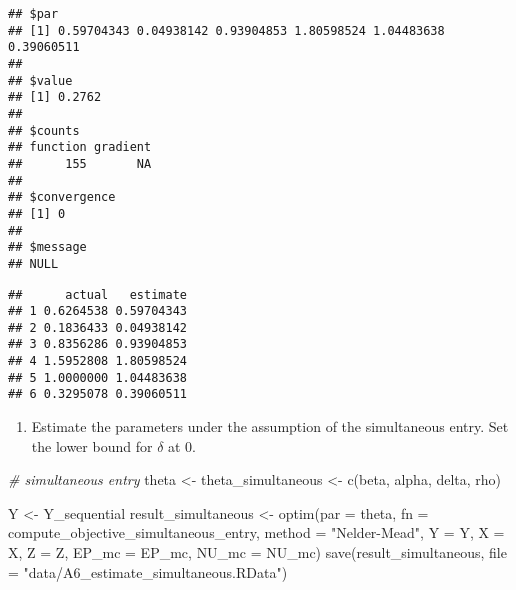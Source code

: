 \documentclass[
]{article}
\newenvironment{Shaded}{\begin{snugshade}}{\end{snugshade}}
\newcommand{\AttributeTok}[1]{\textcolor[rgb]{0.77,0.63,0.00}{#1}}
\newcommand{\CommentTok}[1]{\textcolor[rgb]{0.56,0.35,0.01}{\textit{#1}}}
\newcommand{\FunctionTok}[1]{\textcolor[rgb]{0.00,0.00,0.00}{#1}}
\newcommand{\NormalTok}[1]{#1}
\newcommand{\OtherTok}[1]{\textcolor[rgb]{0.56,0.35,0.01}{#1}}
\newcommand{\SpecialCharTok}[1]{\textcolor[rgb]{0.00,0.00,0.00}{#1}}
\newcommand{\StringTok}[1]{\textcolor[rgb]{0.31,0.60,0.02}{#1}}
\providecommand{\tightlist}{%
  \setlength{\itemsep}{0pt}\setlength{\parskip}{0pt}}
\begin{document}
\begin{verbatim}
## $par
## [1] 0.59704343 0.04938142 0.93904853 1.80598524 1.04483638 0.39060511
## 
## $value
## [1] 0.2762
## 
## $counts
## function gradient 
##      155       NA 
## 
## $convergence
## [1] 0
## 
## $message
## NULL
\end{verbatim}

\begin{Shaded}
\end{Shaded}

\begin{verbatim}
##      actual   estimate
## 1 0.6264538 0.59704343
## 2 0.1836433 0.04938142
## 3 0.8356286 0.93904853
## 4 1.5952808 1.80598524
## 5 1.0000000 1.04483638
## 6 0.3295078 0.39060511
\end{verbatim}

\begin{enumerate}
\def\labelenumi{\arabic{enumi}.}
\setcounter{enumi}{6}
\tightlist
\item
  Estimate the parameters under the assumption of the simultaneous
  entry. Set the lower bound for \(\delta\) at 0.
\end{enumerate}

\begin{Shaded}
\begin{Highlighting}[]
\CommentTok{\# simultaneous entry}
\NormalTok{theta }\OtherTok{\textless{}{-}}\NormalTok{ theta\_simultaneous }\OtherTok{\textless{}{-}}
  \FunctionTok{c}\NormalTok{(beta, alpha, delta, rho)}
\end{Highlighting}
\end{Shaded}

\begin{Shaded}
\begin{Highlighting}[]
\NormalTok{Y }\OtherTok{\textless{}{-}}\NormalTok{ Y\_sequential}
\NormalTok{result\_simultaneous }\OtherTok{\textless{}{-}}
  \FunctionTok{optim}\NormalTok{(}\AttributeTok{par =}\NormalTok{ theta,}
        \AttributeTok{fn =}\NormalTok{ compute\_objective\_simultaneous\_entry,}
        \AttributeTok{method =} \StringTok{"Nelder{-}Mead"}\NormalTok{,}
        \AttributeTok{Y =}\NormalTok{ Y,}
        \AttributeTok{X =}\NormalTok{ X,}
        \AttributeTok{Z =}\NormalTok{ Z,}
        \AttributeTok{EP\_mc =}\NormalTok{ EP\_mc,}
        \AttributeTok{NU\_mc =}\NormalTok{ NU\_mc)}
\FunctionTok{save}\NormalTok{(result\_simultaneous, }\AttributeTok{file =} \StringTok{"data/A6\_estimate\_simultaneous.RData"}\NormalTok{)}
\end{Highlighting}
\end{Shaded}
\end{document}
